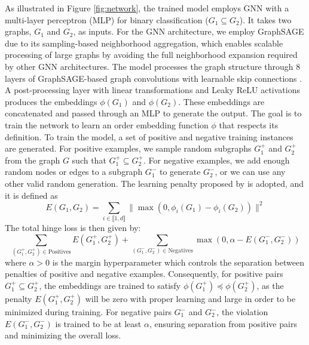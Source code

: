\documentclass[pdflatex,sn-mathphys-num]{sn-jnl}%
\theoremstyle{thmstyleone}%
\theoremstyle{thmstyletwo}%
\theoremstyle{thmstylethree}%
\begin{document}
As illustrated in Figure \ref{fig:network}, the trained model employs GNN with a multi-layer perceptron (MLP) for binary classification (\( G_1 \subseteq G_2 \)). It takes two graphs, \( G_1 \) and \( G_2 \), as inputs. For the GNN architecture, we employ GraphSAGE \cite{hamilton2018inductive} due to its sampling-based neighborhood aggregation, which enables scalable processing of large graphs by avoiding the full neighborhood expansion required by other GNN architectures. The model processes the graph structure through 8 layers of GraphSAGE-based graph convolutions with learnable skip connections \cite{hamilton2018inductive}. A post-processing layer with linear transformations and Leaky ReLU activations produces the embeddings \( \phi(G_1) \) and \( \phi(G_2) \). These embeddings are concatenated and passed through an MLP to generate the output. The goal is to train the network to learn an order embedding function \( \phi \) that respects its definition. To train the model, a set of positive and negative training instances are generated. For positive examples, we sample random subgraphs \( G^+_1 \) and \( G^+_2 \) from the graph \( G \) such that \( G^+_1 \subseteq G^+_2 \). For negative examples, we add enough random nodes or edges to a subgraph \( G^-_1 \) to generate \( G^-_2 \), or we can use any other valid random generation. The learning penalty proposed by \cite{vendrov2016orderembeddings} is adopted, and it is defined as
\[
E(G_1, G_2) = \sum_{i \in \llbracket 1, d \rrbracket} \|\max(0, \phi_i(G_1) - \phi_i(G_2))\|^2
\]
The total hinge loss is then given by:
\begin{equation}
\label{eq:loss_function}
\sum_{(G^+_1, G^+_2) \in \text{Positives}} E(G^+_1, G^+_2) + \sum_{\left(G^-_1, G^-_2\right) \in \text{Negatives}} \max \left(0, \alpha - E\left(G^-_1, G^-_2\right)\right)
\end{equation}
where \(\alpha > 0\) is the margin hyperparameter which controls the separation between penalties of positive and negative examples. Consequently, for positive pairs \( G^+_1 \subseteq G^+_2 \), the embeddings are trained to satisfy \( \phi(G^+_1) \preceq \phi(G^+_2) \), as the penalty \( E(G^+_1, G^+_2) \) will be zero with proper learning and large in order to be minimized during training. For negative pairs \( G^-_1 \) and \( G^-_2 \), the violation \( E(G^-_1, G^-_2) \) is trained to be at least \( \alpha \), ensuring separation from positive pairs and minimizing the overall loss.
\end{document}
